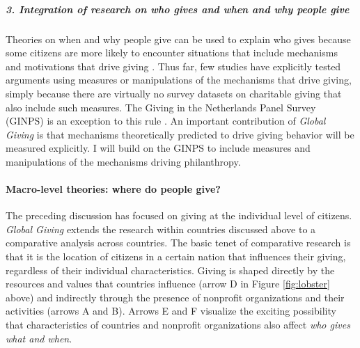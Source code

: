 \documentclass[twocolumn, serif, rga, numeric]{jote-article}
\begin{document}
\subparagraph{3. Integration of research on who gives and when and why people give}

Theories on when and why people give can be used to explain who gives because some citizens are more likely to encounter situations that include mechanisms and motivations that drive giving \cite{Bekkers2011d, Wiepking2012}. Thus far, few studies have explicitly tested arguments using measures or manipulations of the mechanisms that drive giving, simply because there are virtually no survey datasets on charitable giving that also include such measures.
The Giving in the Netherlands Panel Survey (GINPS) is an exception to this rule \cite{Bekkers2013}. An important contribution of \emph{Global Giving} is that mechanisms theoretically predicted to drive giving behavior will be measured explicitly. I will build on the GINPS to include measures and manipulations of the mechanisms driving philanthropy.

\paragraph{Macro-level theories: where do people give?}

The preceding discussion has focused on giving at the individual level of citizens. \emph{Global Giving} extends the research within countries discussed above to a comparative analysis across countries. The basic tenet of comparative research is that it is the location of citizens in a certain nation that influences their giving, regardless of their individual characteristics. Giving is shaped directly by the resources and values that countries influence (arrow D in Figure \ref{fig:lobster} above) and indirectly through the presence of nonprofit organizations and their activities (arrows A and B). Arrows E and F visualize the exciting possibility that characteristics of countries and nonprofit organizations also affect \emph{who gives what and when}.
\end{document}
